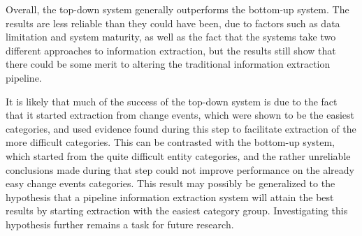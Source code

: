 Overall, the top-down system generally outperforms the bottom-up system. The results are less reliable than they could have been, due to factors such as data limitation and system maturity, as well as the fact that the systems take two different approaches to information extraction, but the results still show that there could be some merit to altering the traditional information extraction pipeline.

It is likely that much of the success of the top-down system is due to the fact that it started extraction from change events, which were shown to be the easiest categories, and used evidence found during this step to facilitate extraction of the more difficult categories. This can be contrasted with the bottom-up system, which started from the quite difficult entity categories, and the rather unreliable conclusions made during that step could not improve performance on the already easy change events categories. This result may possibly be generalized to the hypothesis that a pipeline information extraction system will attain the best results by starting extraction with the easiest category group. Investigating this hypothesis further remains a task for future research.